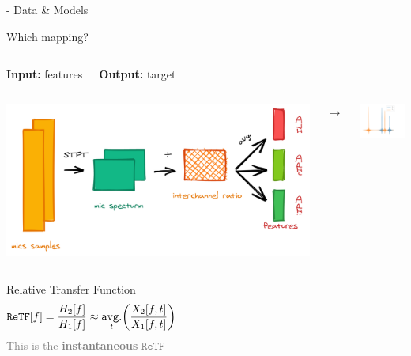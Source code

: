 \begin{frame}{\lantern - Data \& Models}

    \begin{block}{Which mapping?}
        \begin{columns}[onlytextwidth]
            \centering
            \textbf{Input:} features


            \centering
            \textbf{Output:} target
        \end{columns}

        \begin{columns}[onlytextwidth]
            \centering
            \includegraphics[width=\textwidth]{figures/lantern.png}

            $\longrightarrow$

            \centering
            \includegraphics[width=40mm]{figures/rirs1.pdf}
        \end{columns}

        \begin{columns}[T,onlytextwidth]
            \centering
            Relative Transfer Function
            \begin{equation*}
                    \mathtt{ReTF}[f] = \frac{H_2[f]}{H_1[f]} \approx \timeavg \kparen{\frac{X_2[f,t]}{X_1[f,t]}}
            \end{equation*}
            \textcolor{gray}{\small This is the \textbf{instantaneous} $\mathtt{ReTF}$}


\end{columns}
\end{block}
\end{frame}
